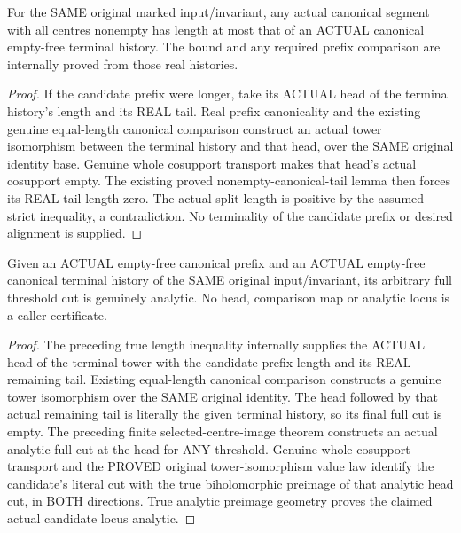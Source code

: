 \begin{lemma}
\label{hir:original-nonempty-canonical-prefix-terminal-length-bound}
\leanok
For the SAME original marked input/invariant, any actual canonical segment
with all centres nonempty has length at most that of an ACTUAL canonical
empty-free terminal history. The bound and any required prefix comparison
are internally proved from those real histories.
\end{lemma}
\begin{proof}
If the candidate prefix were longer, take its ACTUAL head of the terminal
history's length and its REAL tail. Real prefix canonicality and the existing
genuine equal-length canonical comparison construct an actual tower
isomorphism between the terminal history and that head, over the SAME
original identity base. Genuine whole cosupport transport makes that head's
actual cosupport empty. The existing proved nonempty-canonical-tail lemma
then forces its REAL tail length zero. The actual split length is positive
by the assumed strict inequality, a contradiction. No terminality of the
candidate prefix or desired alignment is supplied.
\end{proof}

\begin{theorem}
\label{hir:original-nonempty-canonical-prefix-full-cut-analytic}
\leanok
Given an ACTUAL empty-free canonical prefix and an ACTUAL empty-free canonical
terminal history of the SAME original input/invariant, its arbitrary full
threshold cut is genuinely analytic. No head, comparison map or analytic
locus is a caller certificate.
\end{theorem}
\begin{proof}
The preceding true length inequality internally supplies the ACTUAL head of
the terminal tower with the candidate prefix length and its REAL remaining
tail. Existing equal-length canonical comparison constructs a genuine tower
isomorphism over the SAME original identity. The head followed by that
actual remaining tail is literally the given terminal history, so its final
full cut is empty. The preceding finite selected-centre-image theorem
constructs an actual analytic full cut at the head for ANY threshold.
Genuine whole cosupport transport and the PROVED original tower-isomorphism
value law identify the candidate's literal cut with the true biholomorphic
preimage of that analytic head cut, in BOTH directions. True analytic
preimage geometry proves the claimed actual candidate locus analytic.
\end{proof}

